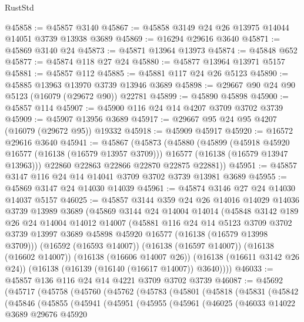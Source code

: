 \begin{lexlean}{RustStd}
\begin{coremodule}
@45858 := @45857 @3140
@45867 := @45858 @3149 @24 @26 @13975 @14044 @14051 @3739 @13938 @3689
@45869 := @16294 @29616 @3640
@45871 := @45869 @3140 @24
@45873 := @45871 @13964 @13973
@45874 := @45848 @652
@45877 := @45874 @118 @27 @24
@45880 := @45877 @13964 @13971 @5157
@45881 := @45857 @112
@45885 := @45881 @117 @24 @26 @5123
@45890 := @45885 @13963 @13970 @3739 @13946 @3689
@45898 := @29667 @90 @24 @90 @5123 (@16079 (@29672 @90)) @22781
@45899 := @45890 @45898
@45900 := @45857 @114
@45907 := @45900 @116 @24 @14 @4207 @3709 @3702 @3739
@45909 := @45907 @13956 @3689
@45917 := @29667 @95 @24 @95 @4207 (@16079 (@29672 @95)) @19332
@45918 := @45909 @45917
@45920 := @16572 @29616 @3640
@45941 := @45867
    (@45873
      (@45880
        (@45899
          (@45918 @45920 @16577 (@16138 (@16579 @13957 @3709)))
          @16577
          (@16138 (@16579 @13947 @13963)))
        @22860
        @22863
        @22866
        @22870
        @22875
        @22881))
@45951 := @45857 @3147 @116 @24 @14 @14041 @3709 @3702 @3739 @13981 @3689
@45955 := @45869 @3147 @24 @14030 @14039
@45961 := @45874 @3146 @27 @24 @14030 @14037 @5157
@46025 := @45857
    @3144
    @359
    @24
    @26
    @14016
    @14029
    @14036
    @3739
    @13989
    @3689
    (@45869
      @3144
      @24
      @14004
      @14014
      (@45848
        @3142
        @189
        @26
        @24
        @14004
        @14012
        @14007
        (@45881
          @116
          @24
          @14
          @5123
          @3709
          @3702
          @3739
          @13997
          @3689
          @45898
          @45920
          @16577
          (@16138 (@16579 @13998 @3709)))
        (@16592 (@16593 @14007))
        (@16138 (@16597 @14007))
        (@16138 (@16602 @14007))
        (@16138 (@16606 @14007 @26))
        (@16138 (@16611 @3142 @26 @24))
        (@16138 (@16139 (@16140 (@16617 @14007)) @3640))))
@46033 := @45857 @136 @116 @24 @14 @4221 @3709 @3702 @3739
@46087 := @45692
    (@45717
      (@45758
        (@45760
          (@45762
            (@45783
              (@45801
                (@45818
                  (@45831
                    (@45842
                      (@45846
                        (@45855
                          (@45941
                            (@45951
                              (@45955
                                (@45961
                                  (@46025
                                    (@46033
                                      @14022
                                      @3689
                                      @29676
                                      @45920

\end{coremodule}
\end{lexlean}
